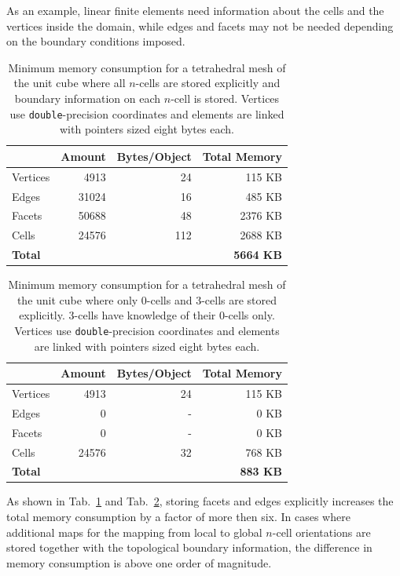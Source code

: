 As an example, linear finite elements need information about the cells and the vertices inside the domain, while edges and facets may not be needed depending on the boundary conditions imposed.

\begin{table}[tb]
 \centering
 \begin{tabular}{|l|r|r|r|}
  \hline
         & Amount      & Bytes/Object         & Total Memory \\
  \hline
  Vertices & 4913 & 24 & 115 KB \\
  \hline
  Edges   & 31024 & 16 & 485 KB \\
  \hline
  Facets  & 50688 & 48 & 2376 KB \\
  \hline
  Cells   & 24576 & 112 & 2688 KB \\
  \hline
  \textbf{Total}  &       &     &  \textbf{5664 KB} \\
  \hline
 \end{tabular}
 \caption{Minimum memory consumption for a tetrahedral mesh of the unit cube where all $n$-cells are stored explicitly and boundary information on each $n$-cell is stored. Vertices use \lstinline|double|-precision coordinates and elements are linked with pointers sized eight bytes each.}
 \label{tab:full-domain-memory}
\end{table}

\begin{table}[tb]
 \centering
 \begin{tabular}{|l|r|r|r|}
  \hline
         & Amount      & Bytes/Object         & Total Memory \\
  \hline
  Vertices & 4913 & 24 & 115 KB \\
  \hline
  Edges   & 0 & - & 0 KB \\
  \hline
  Facets  & 0 & - & 0 KB \\
  \hline
  Cells   & 24576 & 32 & 768 KB \\
  \hline
  \textbf{Total}  &       &     &  \textbf{883 KB} \\
  \hline
 \end{tabular}
 \caption{Minimum memory consumption for a tetrahedral mesh of the unit cube where only $0$-cells and $3$-cells are stored explicitly. $3$-cells have knowledge of their $0$-cells only. Vertices use \lstinline|double|-precision coordinates and elements are linked with pointers sized eight bytes each.}
 \label{tab:slim-domain-memory}
\end{table}

As shown in Tab.~\ref{tab:full-domain-memory} and Tab.~\ref{tab:slim-domain-memory}, storing facets and edges explicitly increases the total memory consumption by a factor of more then six. In cases where additional maps for the mapping from local to global $n$-cell orientations are stored together with the topological boundary information, the difference in memory consumption is above one order of magnitude.

